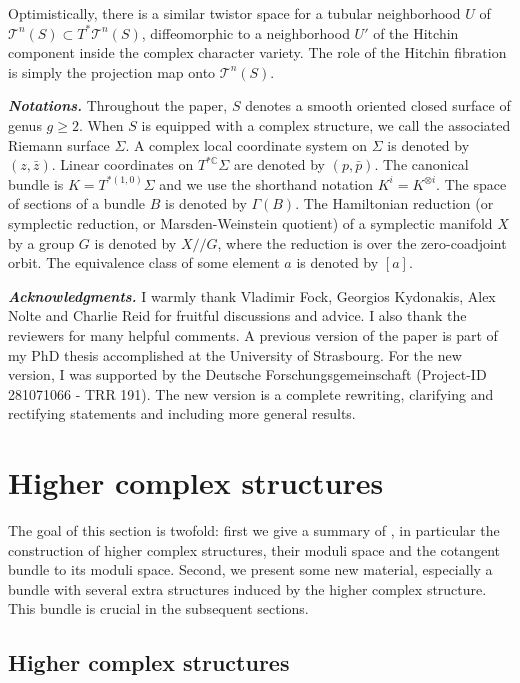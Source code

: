\documentclass[11pt]{amsart}
\numberwithin{thm}{section} %
\numberwithin{equation}{section} %
\numberwithin{figure}{section} %
\newcommand*{\mc}{\mathcal}
\newcommand*{\cotang}{T^*\mc{T}^n(S)}
\newcommand*{\T}{\mc{T}}
\begin{document}
Optimistically, there is a similar twistor space for a tubular neighborhood $U$ of $\T^n(S)\subset\cotang$, diffeomorphic to a neighborhood $U'$ of the Hitchin component inside the complex character variety. The role of the Hitchin fibration is simply the projection map onto $\T^n(S)$.


\bigskip
\noindent \textbf{\textit{Notations.}} Throughout the paper, $S$ denotes a smooth oriented closed surface of genus $g \geq 2$. When $S$ is equipped with a complex structure, we call the associated Riemann surface $\Sigma$. A complex local coordinate system on $\Sigma$ is denoted by $(z, \bar{z})$. Linear coordinates on $T^{*\mathbb{C}}\Sigma$ are denoted by $(p,\bar{p})$. The canonical bundle is $K=T^{*(1,0)}\Sigma$ and we use the shorthand notation $K^i=K^{\otimes i}$. The space of sections of a bundle $B$ is denoted by $\Gamma (B)$. The Hamiltonian reduction (or symplectic reduction, or Marsden-Weinstein quotient) of a symplectic manifold $X$ by a group $G$ is denoted by $X//G$, where the reduction is over the zero-coadjoint orbit. The equivalence class of some element $a$ is denoted by $[a]$.


\bigskip
\noindent \textbf{\textit{Acknowledgments.}}
I warmly thank Vladimir Fock, Georgios Kydonakis, Alex Nolte and Charlie Reid for fruitful discussions and advice. I also thank the reviewers for many helpful comments. A previous version of the paper is part of my PhD thesis accomplished at the University of Strasbourg. For the new version, I was supported by the Deutsche Forschungsgemeinschaft (Project-ID 281071066 - TRR 191). The new version is a complete rewriting, clarifying and rectifying statements and including more general results. 



\section{Higher complex structures}\label{highercomplex}

The goal of this section is twofold: first we give a summary of \cite{FockThomas}, in particular the construction of higher complex structures, their moduli space and the cotangent bundle to its moduli space. 
Second, we present some new material, especially a bundle with several extra structures induced by the higher complex structure. This bundle is crucial in the subsequent sections. 


\subsection{Higher complex structures}
\end{document}
